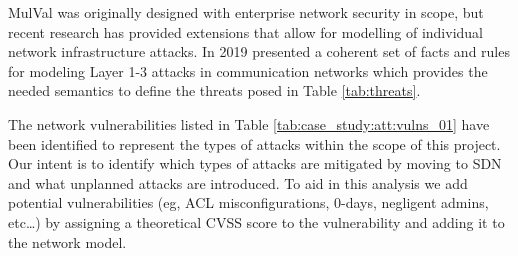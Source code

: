 MulVal was originally designed with enterprise network security in scope, but recent research\cite{Acosta_Padilla_Homer_2016, Bacic_Froh_Henderson_2006, Henderson_Bacic_Froh_2005} has provided extensions that allow for modelling of individual network infrastructure attacks. In 2019 \cite{Stan_Bitton_Ezrets_Dadon_Inokuchi_Ohta_Yamada_Yagyu_Elovici_Shabtai_2019} presented a coherent set of facts and rules for modeling Layer 1-3 attacks in communication networks which provides the needed semantics to define the threats posed in Table \ref{tab:threats}. 

The network vulnerabilities listed in Table \ref{tab:case_study:att:vulns_01} have been identified to represent the types of attacks within the scope of this project. Our intent is to identify which types of attacks are mitigated by moving to SDN and what unplanned attacks are introduced. To aid in this analysis we add potential vulnerabilities (eg, ACL misconfigurations, 0-days, negligent admins, etc…) by assigning a theoretical CVSS score to the vulnerability and adding it to the network model.  



